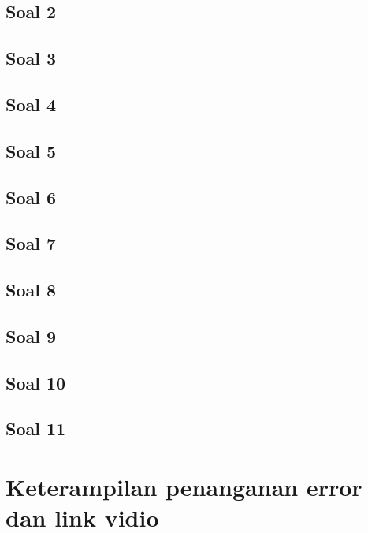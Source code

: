 \documentclass{article}
\begin{document}
    \subsection{Soal 2}
            
    \subsection{Soal 3}
        
    \subsection{Soal 4}
        
    \subsection{Soal 5}
        
    \subsection{Soal 6}
        
    \subsection{Soal 7}
        
    \subsection{Soal 8}
        
    \subsection{Soal 9}
        
    \subsection{Soal 10}
        
    \subsection{Soal 11}
        
    
\section{Keterampilan penanganan error dan link vidio}    
\end{document}
